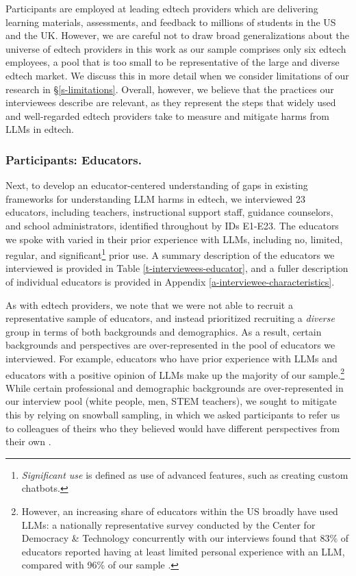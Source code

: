 Participants are employed at leading edtech providers which are delivering learning materials, assessments, and feedback to millions of students in the US and the UK. However, we are careful not to draw broad generalizations about the universe of edtech providers in this work as our sample comprises only six edtech employees, a pool that is too small to be representative of the large and diverse edtech market. We discuss this in more detail when we consider limitations of our research in \S\ref{s-limitations}. Overall, however, we believe that the practices our interviewees describe are relevant, as they represent the steps that widely used and well-regarded edtech providers take to measure and mitigate harms from LLMs in edtech.

\subsubsection*{Participants: Educators.} Next, to develop an educator-centered understanding of gaps in existing frameworks for understanding LLM harms in edtech, we interviewed 23 educators, including teachers, instructional support staff, guidance counselors, and school administrators, identified throughout by IDs E1-E23. The educators we spoke with varied in their prior experience with LLMs, including no, limited, regular, and significant\footnote{\textit{Significant use} is defined as use of advanced features, such as creating custom chatbots.} prior use. A summary description of the educators we interviewed is provided in Table \ref{t-interviewees-educator}, and a fuller description of individual educators is provided in Appendix \ref{a-interviewee-characteristics}.

As with edtech providers, we note that we were not able to recruit a representative sample of educators, and instead prioritized recruiting a \textit{diverse} group in terms of both backgrounds and demographics. As a result, certain backgrounds and perspectives are over-represented in the pool of educators we interviewed. For example, educators who have prior experience with LLMs and educators with a positive opinion of LLMs make up the majority of our sample.\footnote{However, an increasing share of educators within the US broadly have used LLMs: a nationally representative survey conducted by the Center for Democracy \& Technology concurrently with our interviews found that 83\% of educators reported having at least limited personal experience with an LLM, compared with 96\% of our sample \cite{dwyer_up_2024}.} While certain professional and demographic backgrounds are over-represented in our interview pool (white people, men, STEM teachers), we sought to mitigate this by relying on snowball sampling, in which we asked participants to refer us to colleagues of theirs who they believed would have different perspectives from their own \cite{morgan2008snowball}.

